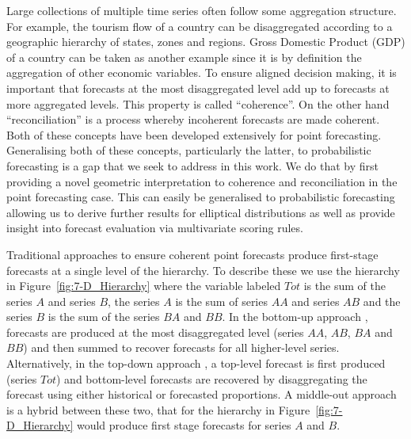 

	Large collections of multiple time series often follow some aggregation structure. For example, the tourism flow of a country can be disaggregated according to a geographic hierarchy of states, zones and regions. Gross Domestic Product (GDP) of a country can be taken as another example since it is by definition the aggregation of other economic variables. To ensure aligned decision making, it is important that forecasts at the most disaggregated level add up to forecasts at more aggregated levels. This property is called ``coherence''.  On the other hand ``reconciliation'' is a process whereby incoherent forecasts are made coherent. Both of these concepts have been developed extensively for point forecasting. Generalising both of these concepts, particularly the latter, to probabilistic forecasting is a gap that we seek to address in this work.  We do that by first providing a novel geometric interpretation to coherence and reconciliation in the point forecasting case. This can easily be generalised to probabilistic forecasting allowing us to derive further results for elliptical distributions as well as provide insight into forecast evaluation via multivariate scoring rules. 
	
	Traditional approaches to ensure coherent point forecasts produce first-stage forecasts at a single level of the hierarchy. To describe these we use the hierarchy in Figure~\ref{fig:7-D_Hierarchy} where the variable labeled $Tot$ is the sum of the series $A$ and series $B$, the series $A$ is the sum of series $AA$ and series $AB$ and the series $B$ is the sum of the series $BA$ and $BB$. In the bottom-up approach \citep{Dunn1976}, forecasts are produced at the most disaggregated level (series $AA$, $AB$, $BA$ and $BB$) and then summed to recover forecasts for all higher-level series. Alternatively, in the top-down approach \citep{Gross1990}, a top-level forecast is first produced (series $Tot$) and bottom-level forecasts are recovered by disaggregating the forecast using either historical or forecasted proportions. A middle-out approach is a hybrid between these two, that for the hierarchy in Figure~\ref{fig:7-D_Hierarchy} would produce first stage forecasts for series $A$ and $B$.
	
